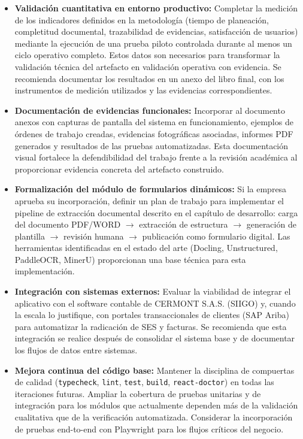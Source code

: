 \begin{itemize}
  \item \textbf{Validación cuantitativa en entorno productivo:} Completar la medición de los indicadores definidos en la metodología (tiempo de planeación, completitud documental, trazabilidad de evidencias, satisfacción de usuarios) mediante la ejecución de una prueba piloto controlada durante al menos un ciclo operativo completo. Estos datos son necesarios para transformar la validación técnica del artefacto en validación operativa con evidencia. Se recomienda documentar los resultados en un anexo del libro final, con los instrumentos de medición utilizados y las evidencias correspondientes.
  
  \item \textbf{Documentación de evidencias funcionales:} Incorporar al documento anexos con capturas de pantalla del sistema en funcionamiento, ejemplos de órdenes de trabajo creadas, evidencias fotográficas asociadas, informes PDF generados y resultados de las pruebas automatizadas. Esta documentación visual fortalece la defendibilidad del trabajo frente a la revisión académica al proporcionar evidencia concreta del artefacto construido.
  
  \item \textbf{Formalización del módulo de formularios dinámicos:} Si la empresa aprueba su incorporación, definir un plan de trabajo para implementar el pipeline de extracción documental descrito en el capítulo de desarrollo: carga del documento PDF/WORD $\rightarrow$ extracción de estructura $\rightarrow$ generación de plantilla $\rightarrow$ revisión humana $\rightarrow$ publicación como formulario digital. Las herramientas identificadas en el estado del arte (Docling, Unstructured, PaddleOCR, MinerU) proporcionan una base técnica para esta implementación.
  
  \item \textbf{Integración con sistemas externos:} Evaluar la viabilidad de integrar el aplicativo con el software contable de CERMONT S.A.S. (SIIGO) y, cuando la escala lo justifique, con portales transaccionales de clientes (SAP Ariba) para automatizar la radicación de SES y facturas. Se recomienda que esta integración se realice después de consolidar el sistema base y de documentar los flujos de datos entre sistemas.
  
  \item \textbf{Mejora continua del código base:} Mantener la disciplina de compuertas de calidad (\texttt{typecheck}, \texttt{lint}, \texttt{test}, \texttt{build}, \texttt{react-doctor}) en todas las iteraciones futuras. Ampliar la cobertura de pruebas unitarias y de integración para los módulos que actualmente dependen más de la validación cualitativa que de la verificación automatizada. Considerar la incorporación de pruebas end-to-end con Playwright para los flujos críticos del negocio.
  

\end{itemize}
